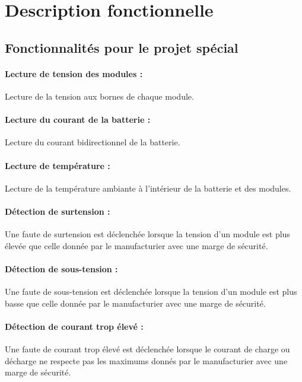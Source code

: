 \section{Description fonctionnelle}

	\subsection{Fonctionnalités pour le projet spécial}
	
		\paragraph{Lecture de tension des modules :} 
		Lecture de la tension aux bornes de chaque module.
		
		\paragraph{Lecture du courant de la batterie :}	
		Lecture du courant bidirectionnel de la batterie.
		
		\paragraph{Lecture de température :}	
		Lecture de la température ambiante à l'intérieur de la batterie et des modules. 
		
		\paragraph{Détection de surtension :}	
		Une faute de surtension est déclenchée lorsque la tension d'un module est plus élevée que celle donnée par le manufacturier avec une marge de sécurité.  
		
		\paragraph{Détection de sous-tension :}	
		Une faute de sous-tension est déclenchée lorsque la tension d'un module est plus basse que celle donnée par le manufacturier avec une marge de sécurité.
		
		\paragraph{Détection de courant trop élevé :}	
		Une faute de courant trop élevé est déclenchée lorsque le courant de charge ou décharge ne respecte pas les maximums donnés par le manufacturier avec une marge de sécurité.
		
